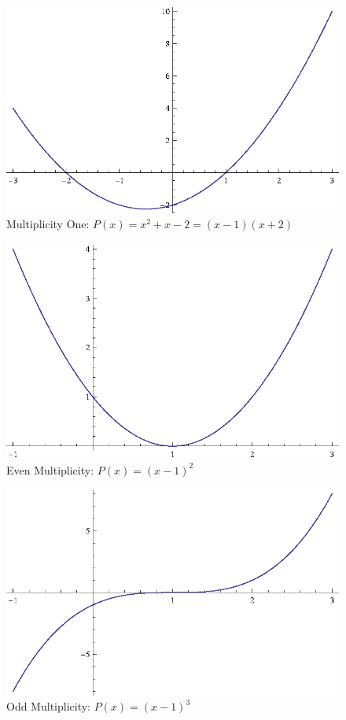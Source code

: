 \documentclass{article}
\begin{document}
\begin{figure}[H]
  \centering
  \includegraphics[scale=0.9]{graph2.eps}
  \caption*{Multiplicity One: $P(x) = x^2 + x - 2 = (x - 1)(x + 2)$}
\end{figure}

\begin{figure}[H]
  \centering
  \includegraphics[scale=0.9]{graph1.eps}
  \caption*{Even Multiplicity: $P(x) = (x - 1)^2$}
\end{figure}

\begin{figure}[H]
  \centering
  \includegraphics[scale=0.9]{graph3.eps}
  \caption*{Odd Multiplicity: $P(x) = (x - 1)^3$}
\end{figure}
\end{document}
